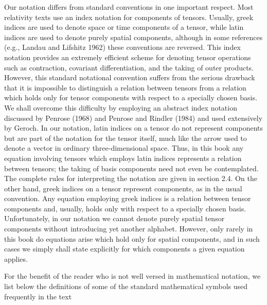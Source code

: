 Our notation differs from standard conventions in one important respect. Most relativity texts use an index notation for components of tensors. Usually, greek indices are used to denote space or time components of a tensor, while latin indices are used to denote purely spatial components, although in some references (e.g., Landau and Lifshitz 1962) these conventions are reversed. This index notation provides an extremely efficient scheme for denoting tensor operations such as contraction, covariant differentiation, and the taking of outer products. However, this standard notational convention suffers from the serious drawback that it is impossible to distinguish a relation between tensors from a relation which holds only for tensor components with respect to a specially chosen basis. We shall overcome this difficulty by employing an abstract index notation discussed by Penrose (1968) and Penrose and Rindler (1984) and used extensively by Geroch. In our notation, latin indices on a tensor do not represent components but are part of the notation for the tensor itself, much like the arrow used to denote a vector in ordinary three-dimensional space. Thus, in this book any equation involving tensors which employs latin indices represents a relation between tensors; the taking of basis components need not even be contemplated. The complete rules for interpreting the notation are given in section 2.4. On the other hand, greek indices on a tensor represent components, as in the usual convention. Any equation employing greek indices is a relation between tensor components and, usually, holds only with respect to a specially chosen basis. Unfortunately, in our notation we cannot denote purely spatial tensor components without introducing yet another alphabet. However, only rarely in this book do equations arise which hold only for spatial components, and in such cases we simply shall state explicitly for which components a given equation applies.

For the benefit of the reader who is not well versed in mathematical notation, we list below the definitions of some of the standard mathematical symbols used frequently in the text

